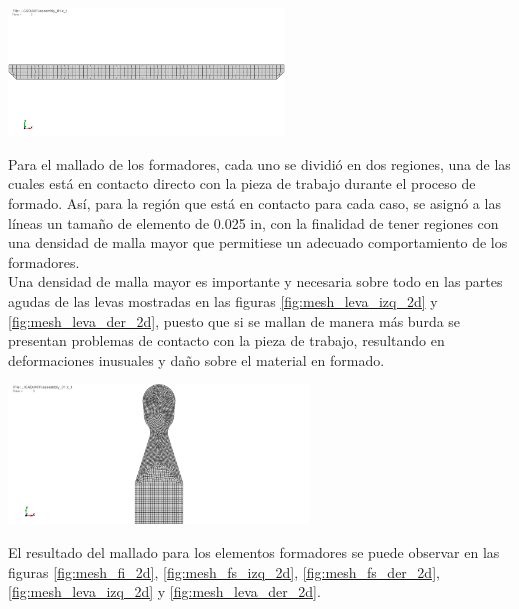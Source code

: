 \begin{center}
\includegraphics[width=0.55\textwidth]{src/ch3/mesh_blank_2d.png}
\label{fig:mesh_blank_2d}
\end{center}

Para el mallado de los formadores, cada uno se dividió en dos regiones, una de las cuales 
está en contacto directo con la pieza de trabajo durante el proceso de formado. Así, para 
la región que está en contacto para cada caso, se asignó  a las líneas un tamaño de elemento 
de 0.025 in, con la finalidad de tener regiones con una densidad de malla mayor 
que permitiese un adecuado comportamiento de los formadores. \\

Una densidad de malla mayor es importante y necesaria sobre todo en las partes agudas de las levas mostradas en 
las figuras \ref{fig:mesh_leva_izq_2d} y \ref{fig:mesh_leva_der_2d}, puesto que si se mallan de manera más burda 
se presentan problemas de contacto con la pieza de trabajo, resultando en deformaciones inusuales y daño sobre 
el material en formado.

\begin{center}
\includegraphics[width=0.60\textwidth]{src/ch3/mesh_fi_2d.png}
\label{fig:mesh_fi_2d}
\end{center}

El resultado del mallado para los elementos formadores se puede observar en las figuras \ref{fig:mesh_fi_2d}, 
\ref{fig:mesh_fs_izq_2d}, \ref{fig:mesh_fs_der_2d}, \ref{fig:mesh_leva_izq_2d} y \ref{fig:mesh_leva_der_2d}.

